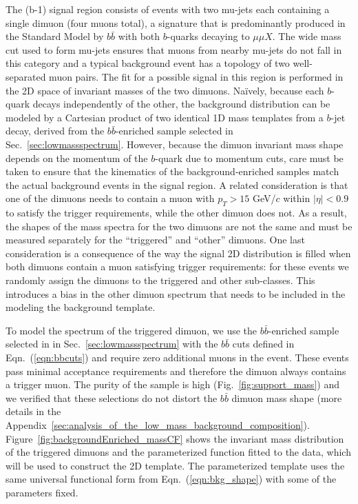 The (b-1) signal region consists of events with two mu-jets each
containing a single dimuon (four muons total), a signature that is
predominantly produced in the Standard Model by $b\bar{b}$ with both
$b$-quarks decaying to $\mu\mu X$. The wide mass cut used to form
mu-jets ensures that muons from nearby mu-jets do not fall in this
category and a typical background event has a topology of two
well-separated muon pairs. The fit for a possible signal in this
region is performed in the 2D space of invariant masses of the two
dimuons. Na\"ively, because each $b$-quark decays independently of the
other, the background distribution can be modeled by a Cartesian
product of two identical 1D mass templates from a $b$-jet decay,
derived from the $b\bar{b}$-enriched sample selected in
Sec.~\ref{sec:lowmassspectrum}. However, because the dimuon invariant
mass shape depends on the momentum of the $b$-quark due to momentum
cuts, care must be taken to ensure that the kinematics of the
background-enriched samples match the actual background events in the
signal region. A related consideration is that one of the dimuons
needs to contain a muon with $p_T>15$ GeV/$c$ within $|\eta|<0.9$ to
satisfy the trigger requirements, while the other dimuon does not. As
a result, the shapes of the mass spectra for the two dimuons are not
the same and must be measured separately for the ``triggered'' and
``other'' dimuons. One last consideration is a consequence of the way
the signal 2D distribution is filled when both dimuons contain a muon
satisfying trigger requirements: for these events we randomly assign
the dimuons to the triggered and other sub-classes.  This introduces a
bias in the other dimuon spectrum that needs to be included in the
modeling the background template.

To model the spectrum of the triggered dimuon, we use the
$b\bar{b}$-enriched sample selected in in
Sec.~\ref{sec:lowmassspectrum} with the $b\bar{b}$ cuts defined in
Eqn.~(\ref{eqn:bbcuts}) and require zero additional muons in the
event. These events pass minimal acceptance requirements and therefore
the dimuon always contains a trigger muon. The purity of the sample is
high (Fig.~\ref{fig:support_mass}) and we verified that these
selections do not distort the $b\bar{b}$ dimuon mass shape (more
details in the
Appendix~\ref{sec:analysis_of_the_low_mass_background_composition}). Figure~\ref{fig:backgroundEnriched_massCF}
shows the invariant mass distribution of the triggered dimuons and the
parameterized function fitted to the data, which will be used to
construct the 2D template. The parameterized template uses the same
universal functional form from Eqn.~(\ref{eqn:bkg_shape}) with some of
the parameters fixed.

